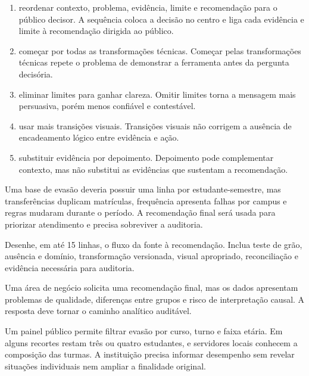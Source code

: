 \begin{enumerate}[label=\Alph*)]
  \item reordenar contexto, problema, evidência, limite e recomendação para o público decisor. A sequência coloca a decisão no centro e liga cada evidência e limite à recomendação dirigida ao público.
  \item começar por todas as transformações técnicas. Começar pelas transformações técnicas repete o problema de demonstrar a ferramenta antes da pergunta decisória.
  \item eliminar limites para ganhar clareza. Omitir limites torna a mensagem mais persuasiva, porém menos confiável e contestável.
  \item usar mais transições visuais. Transições visuais não corrigem a ausência de encadeamento lógico entre evidência e ação.
  \item substituir evidência por depoimento. Depoimento pode complementar contexto, mas não substitui as evidências que sustentam a recomendação.
\end{enumerate}


\TextoBase

Uma base de evasão deveria possuir uma linha por estudante-semestre, mas transferências duplicam matrículas, frequência apresenta falhas por campus e regras mudaram durante o período. A recomendação final será usada para priorizar atendimento e precisa sobreviver a auditoria.

\FonteDidatica

\Comando Desenhe, em até 15 linhas, o fluxo da fonte à recomendação. Inclua teste de grão, ausência e domínio, transformação versionada, visual apropriado, reconciliação e evidência necessária para auditoria.


\TextoBase

Uma área de negócio solicita uma recomendação final, mas os dados apresentam problemas de qualidade, diferenças entre grupos e risco de interpretação causal. A resposta deve tornar o caminho analítico auditável.


Um painel público permite filtrar evasão por curso, turno e faixa etária. Em alguns recortes restam três ou quatro estudantes, e servidores locais conhecem a composição das turmas. A instituição precisa informar desempenho sem revelar situações individuais nem ampliar a finalidade original.


